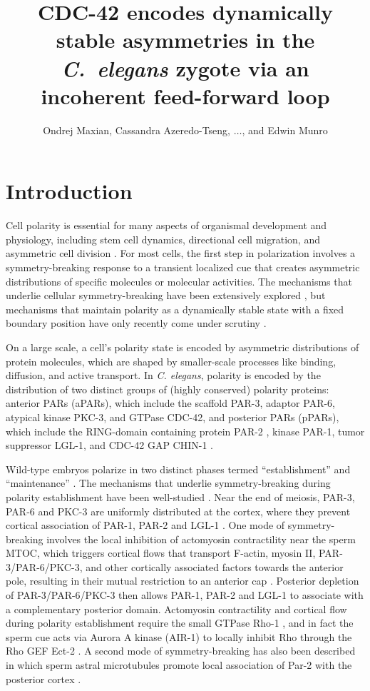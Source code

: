 \documentclass[11pt]{article}
\title{CDC-42 encodes dynamically stable asymmetries in the \emph{C.\ elegans} zygote via an incoherent feed-forward loop}
\author{Ondrej Maxian, Cassandra Azeredo-Tseng, $\dots$, and Edwin Munro \vspace{-0.75 cm}}
\newcommand{\6}[1]{#1_{\text{6}}}
\newcommand{\3}[1]{#1_{\text{3}}}
\begin{document}
\maketitle

\section{Introduction}
Cell polarity is essential for many aspects of organismal development and physiology, including stem cell dynamics, directional cell migration, and asymmetric cell division \citep{dewey2015cell, goldstein2007proteins, ierushalmi2021cytoskeletal, maitre2016asymmetric}. For most cells, the first step in polarization involves a symmetry-breaking response to a transient localized cue that creates asymmetric distributions of specific molecules or molecular activities. The mechanisms that underlie cellular symmetry-breaking have been extensively explored \citep{li2010symmetry}, but mechanisms that maintain polarity as a dynamically stable state with a fixed boundary position have only recently come under scrutiny \citep{sailer2015dynamic, gross2019guiding}.

On a large scale, a cell's polarity state is encoded by asymmetric distributions of protein molecules, which are shaped by smaller-scale processes like binding, diffusion, and active transport. In \emph{C. elegans}, polarity is encoded by the distribution of two distinct groups of (highly conserved) polarity proteins: anterior PARs (aPARs), which include the scaffold PAR-3, adaptor PAR-6, atypical kinase PKC-3, and GTPase CDC-42, and posterior PARs (pPARs), which include the RING-domain containing protein PAR-2 \citep{bland2023optimized}, kinase PAR-1, tumor suppressor LGL-1, and CDC-42 GAP CHIN-1 \citep{lang2017proteins}. 

Wild-type embryos polarize in two distinct phases termed ``establishment'' and ``maintenance'' \citep{cuenca2003polarization}. The mechanisms that underlie symmetry-breaking during polarity establishment have been well-studied \citep{cowan2007acto, munro2009cellular}.  Near the end of meiosis, PAR-3, PAR-6 and PKC-3 are uniformly distributed at the cortex, where they prevent cortical association of PAR-1, PAR-2 and LGL-1 \citep{schonegg2006cdc, others}.  One mode of symmetry-breaking involves the local inhibition of actomyosin contractility near the sperm MTOC, which triggers cortical flows that transport F-actin, myosin II, PAR-3/PAR-6/PKC-3, and other cortically associated factors towards the anterior pole, resulting in their mutual restriction to an anterior cap \citep{munro2004cortical, rodriguez2017apkc}. Posterior depletion of PAR-3/PAR-6/PKC-3 then allows PAR-1, PAR-2 and LGL-1 to associate with a complementary posterior domain.  Actomyosin contractility and cortical flow during polarity establishment require the small GTPase Rho-1 \citep{schonegg2006cdc, motegi2006sequential}, and in fact the sperm cue acts via Aurora A kinase (AIR-1) to locally inhibit Rho through the Rho GEF Ect-2 \citep{motegi2006sequential, tse2012rhoa, longhini2022aurora, kapoor2019centrosome}.  A second mode of symmetry-breaking has also been described in which sperm astral microtubules promote local association of Par-2 with the posterior cortex \citep{motegi2011microtubules}.
\end{document}
